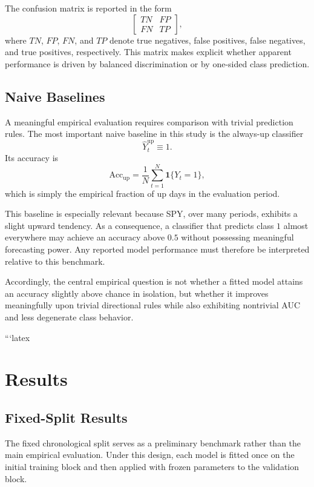 \documentclass[11pt,a4paper]{article}
\begin{document}
	The confusion matrix is reported in the form
	\[
	\begin{bmatrix}
		TN & FP \\
		FN & TP
	\end{bmatrix},
	\]
	where \(TN\), \(FP\), \(FN\), and \(TP\) denote true negatives, false positives, false negatives, and true positives, respectively. This matrix makes explicit whether apparent performance is driven by balanced discrimination or by one-sided class prediction.
	
	\subsection{Naive Baselines}
	
	A meaningful empirical evaluation requires comparison with trivial prediction rules. The most important naive baseline in this study is the always-up classifier
	\[
	\widehat{Y}_t^{\mathrm{up}} \equiv 1.
	\]
	Its accuracy is
	\[
	\mathrm{Acc}_{\mathrm{up}}
	=
	\frac{1}{N}\sum_{t=1}^{N} \mathbf{1}\{Y_t = 1\},
	\]
	which is simply the empirical fraction of up days in the evaluation period.
	
	This baseline is especially relevant because SPY, over many periods, exhibits a slight upward tendency. As a consequence, a classifier that predicts class \(1\) almost everywhere may achieve an accuracy above \(0.5\) without possessing meaningful forecasting power. Any reported model performance must therefore be interpreted relative to this benchmark.
	
	Accordingly, the central empirical question is not whether a fitted model attains an accuracy slightly above chance in isolation, but whether it improves meaningfully upon trivial directional rules while also exhibiting nontrivial AUC and less degenerate class behavior.
	
	```latex
	\section{Results}
	
	\subsection{Fixed-Split Results}
	
	The fixed chronological split serves as a preliminary benchmark rather than the main empirical evaluation. Under this design, each model is fitted once on the initial training block and then applied with frozen parameters to the validation block.
	
\end{document}
